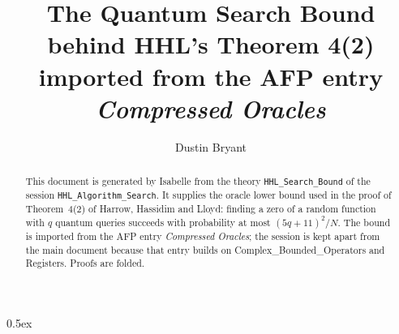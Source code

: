 \documentclass[11pt,a4paper]{article}
\begin{document}
\title{The Quantum Search Bound behind HHL's Theorem 4(2)\\[0.5em]
  \large imported from the AFP entry \emph{Compressed Oracles}}
\author{Dustin Bryant}
\maketitle

\begin{abstract}
This document is generated by Isabelle from the theory \texttt{HHL\_Search\_Bound} of the
session \texttt{HHL\_Algorithm\_Search}.  It supplies the oracle lower bound used in the
proof of Theorem~4(2) of Harrow, Hassidim and Lloyd: finding a zero of a random function with
$q$ quantum queries succeeds with probability at most $(5q+11)^2/N$.  The bound is imported
from the AFP entry \emph{Compressed Oracles}; the session is kept apart from the main document
because that entry builds on Complex\_Bounded\_Operators and Registers.  Proofs are folded.
\end{abstract}

\parindent 0pt\parskip 0.5ex


\end{document}
